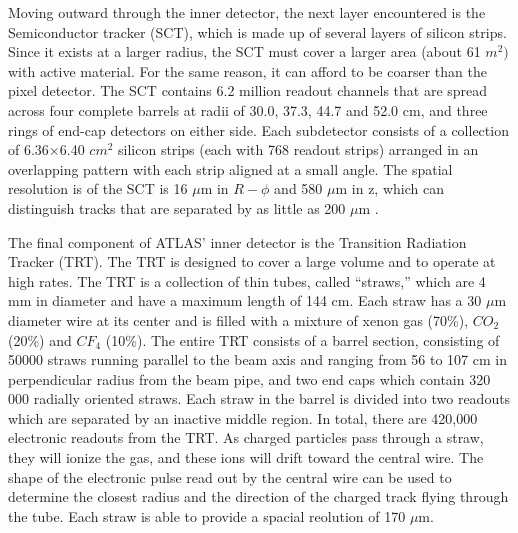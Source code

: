 
Moving outward through the inner detector, the next layer encountered is the Semiconductor tracker (SCT), which is made up of several layers of silicon strips.
Since it exists at a larger radius, the SCT must cover a larger area (about 61 $m^2)$ with active material.
For the same reason, it can afford to be coarser than the pixel detector.
The SCT contains 6.2 million readout channels that are spread across four complete barrels at radii of 30.0, 37.3, 44.7 and 52.0 cm, and three rings of end-cap detectors on either side.
Each subdetector consists of a collection of 6.36$\times$6.40 $cm^2$ silicon strips (each with 768 readout strips) arranged in an overlapping pattern with each strip aligned at a small angle.
The spatial resolution is of the SCT is 16 $\mu$m in $R-\phi$ and 580 $\mu$m in z, which can distinguish tracks that are separated by as little as 200 $\mu$m \cite{PIXEL_PERFORMANCE}.

The final component of ATLAS' inner detector is the Transition Radiation Tracker (TRT).
The TRT is designed to cover a large volume and to operate at high rates.
The TRT is a collection of thin tubes, called ``straws,'' which are 4 mm in diameter and have a maximum length of 144 cm.
Each straw has a 30 $\mu$m diameter wire at its center and is filled with a mixture of xenon gas (70\%), $CO_2$ (20\%) and $CF_{4}$ (10\%).
The entire TRT consists of a barrel section, consisting of 50000 straws running parallel to the beam axis and ranging from 56 to 107 cm in perpendicular radius from the beam pipe, and two end caps which contain 320 000 radially oriented straws.
Each straw in the barrel is divided into two readouts which are separated by an inactive middle region.
In total, there are 420,000 electronic readouts from the TRT.
As charged particles pass through a straw, they will ionize the gas, and these ions will drift toward the central wire.
The shape of the electronic pulse read out by the central wire can be used to determine the closest radius and the direction of the charged track flying through the tube.
Each straw is able to provide a spacial reolution of 170 $\mu$m.


